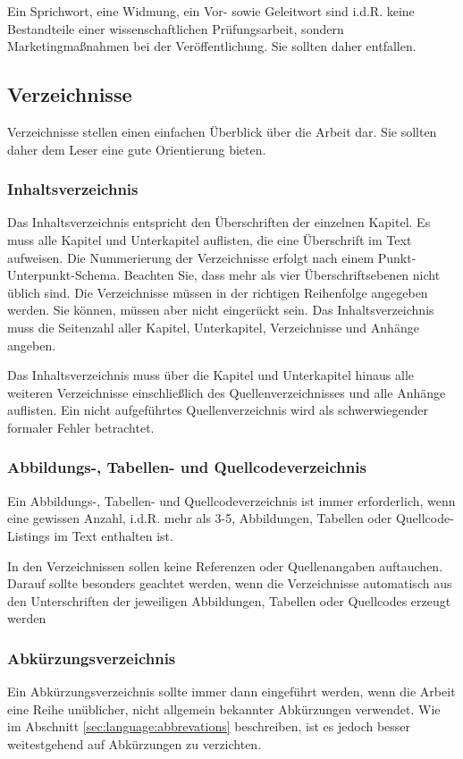 Ein Sprichwort, eine Widmung, ein Vor- sowie Geleitwort sind i.d.R. keine Bestandteile einer wissenschaftlichen Prüfungsarbeit, sondern Marketingmaßnahmen bei der Veröffentlichung. Sie sollten daher entfallen.

\subsection{Verzeichnisse}\label{sec:structure:tables}
%
Verzeichnisse stellen einen einfachen Überblick über die Arbeit dar. Sie sollten daher dem Leser eine gute Orientierung bieten.

\subsubsection{Inhaltsverzeichnis}\label{sec:structure:tables:toc}
%
Das Inhaltsverzeichnis entspricht den Überschriften der einzelnen Kapitel. Es muss alle Kapitel und Unterkapitel auflisten, die eine Überschrift im Text aufweisen. Die Nummerierung der Verzeichnisse erfolgt nach einem Punkt-Unterpunkt-Schema. Beachten Sie, dass mehr als vier Überschriftsebenen nicht üblich sind. Die Verzeichnisse müssen in der richtigen Reihenfolge angegeben werden. Sie können, müssen aber nicht eingerückt sein. Das Inhaltsverzeichnis muss die Seitenzahl aller Kapitel, Unterkapitel, Verzeichnisse und Anhänge angeben.

Das Inhaltsverzeichnis muss über die Kapitel und Unterkapitel hinaus alle weiteren Verzeichnisse einschließlich des Quellenverzeichnisses und alle Anhänge auflisten. Ein nicht aufgeführtes Quellenverzeichnis wird als schwerwiegender formaler Fehler betrachtet.

\subsubsection{Abbildungs-, Tabellen- und Quellcodeverzeichnis}\label{sec:structure:tables:misc}
%
Ein Abbildungs-, Tabellen- und Quellcodeverzeichnis ist immer erforderlich, wenn eine gewissen Anzahl, i.d.R. mehr als 3-5, Abbildungen, Tabellen oder  Quellcode-Listings im Text enthalten ist.

In den Verzeichnissen sollen keine Referenzen oder Quellenangaben auftauchen. Darauf sollte besonders geachtet werden, wenn die Verzeichnisse automatisch aus den Unterschriften der jeweiligen Abbildungen, Tabellen oder Quellcodes erzeugt werden

\subsubsection{Abkürzungsverzeichnis}\label{sec:structure:tables:abrev}
%
Ein Abkürzungsverzeichnis sollte immer dann eingeführt werden, wenn die Arbeit eine Reihe unüblicher, nicht allgemein bekannter Abkürzungen verwendet. Wie im Abschnitt \ref{sec:language:abbrevations} beschreiben, ist es jedoch besser weitestgehend auf Abkürzungen zu verzichten.

